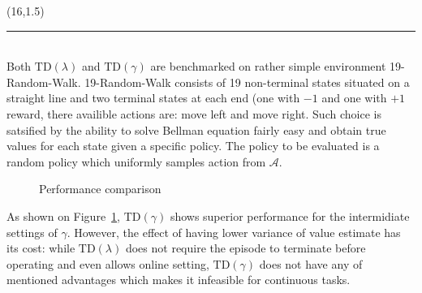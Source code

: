 \documentclass[a0]{a0poster}
\def\Head#1{\noindent{\LARGE\color{bluegray} #1}\bigskip}
\begin{document}
\begin{textblock}{7.0}(16,1.5)

\medskip
\hrule\medskip
\Head{Experiment}\\

Both $\text{TD}(\lambda)$ and $\text{TD}(\gamma)$ are benchmarked on rather
simple environment 19-Random-Walk. 19-Random-Walk consists of 19 non-terminal
states situated on a straight line and two terminal states at each end (one
with $-1$ and one with $+1$ reward, there availible actions are: move left and
move right. Such choice is satsified by the ability to solve Bellman equation
fairly easy and obtain true values for each state given a specific policy. The
policy to be evaluated is a random policy which uniformly samples action from
$\mathcal{A}$.

\begin{center}
\begin{figure}%
    \centering
    \qquad
    \caption{Performance comparison}%
    \label{fig:results}%
\end{figure}
\end{center}

As shown on Figure~\ref{fig:results}, $\text{TD}(\gamma)$ shows superior
performance for the intermidiate settings of $\gamma$. However, the effect of
having lower variance of value estimate has its cost: while
$\text{TD}(\lambda)$ does not require the episode to terminate before operating
and even allows online setting, $\text{TD}(\gamma)$ does not have any of
mentioned advantages which makes it infeasible for continuous tasks.


\end{textblock}
\end{document}
